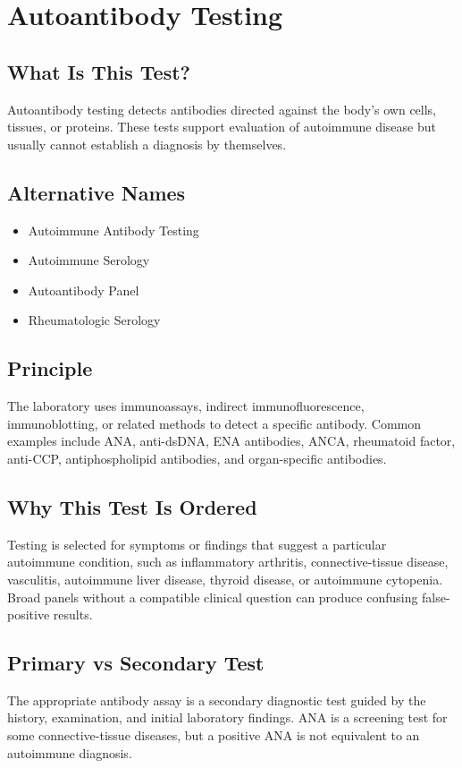 \chapter{Autoantibody Testing}

\section*{What Is This Test?}
Autoantibody testing detects antibodies directed against the body's own cells, tissues, or proteins. These tests support evaluation of autoimmune disease but usually cannot establish a diagnosis by themselves.

\section*{Alternative Names}
\begin{itemize}
  \item Autoimmune Antibody Testing
  \item Autoimmune Serology
  \item Autoantibody Panel
  \item Rheumatologic Serology
\end{itemize}

\section*{Principle}
The laboratory uses immunoassays, indirect immunofluorescence, immunoblotting, or related methods to detect a specific antibody. Common examples include ANA, anti-dsDNA, ENA antibodies, ANCA, rheumatoid factor, anti-CCP, antiphospholipid antibodies, and organ-specific antibodies.

\section*{Why This Test Is Ordered}
Testing is selected for symptoms or findings that suggest a particular autoimmune condition, such as inflammatory arthritis, connective-tissue disease, vasculitis, autoimmune liver disease, thyroid disease, or autoimmune cytopenia. Broad panels without a compatible clinical question can produce confusing false-positive results.

\section*{Primary vs Secondary Test}
The appropriate antibody assay is a secondary diagnostic test guided by the history, examination, and initial laboratory findings. ANA is a screening test for some connective-tissue diseases, but a positive ANA is not equivalent to an autoimmune diagnosis.

